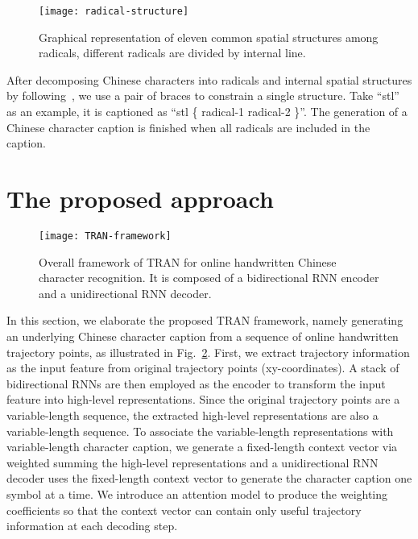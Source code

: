 \documentclass[a4paper,conference]{IEEEtran}
\begin{document}
\begin{figure}
\centering
\texttt{[image: radical-structure]}
\caption{Graphical representation of eleven common spatial structures among radicals, different radicals are divided by internal line.}
\label{fig:radical-structure}
\end{figure}

After decomposing Chinese characters into radicals and internal spatial structures by following~\cite{cjk-decomp}, we use a pair of braces to constrain a single structure. Take ``stl'' as an example, it is captioned as ``stl \{ radical-1 radical-2 \}''. The generation of a Chinese character caption is finished when all radicals are included in the caption.


\section{The proposed approach}
\label{sec:The proposed approach}

\begin{figure}
\centering
\texttt{[image: TRAN-framework]}
\caption{Overall framework of TRAN for online handwritten Chinese character recognition. It is composed of a bidirectional RNN encoder and a unidirectional RNN decoder.}
\label{fig:TRAN-framework}
\end{figure}

In this section, we elaborate the proposed TRAN framework, namely generating an underlying Chinese character caption from a sequence of online handwritten trajectory points, as illustrated in Fig.~\ref{fig:TRAN-framework}. First, we extract trajectory information as the input feature from original trajectory points (xy-coordinates). A stack of bidirectional RNNs are then employed as the encoder to transform the input feature into high-level representations. Since the original trajectory points are a variable-length sequence, the extracted high-level representations are also a variable-length sequence. To associate the variable-length representations with variable-length character caption, we generate a fixed-length context vector via weighted summing the high-level representations and a unidirectional RNN decoder uses the fixed-length context vector to generate the character caption one symbol at a time. We introduce an attention model to produce the weighting coefficients so that the context vector can contain only useful trajectory information at each decoding step.
\end{document}
